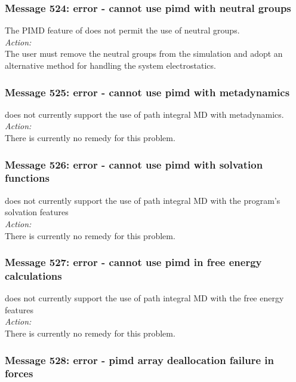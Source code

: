 \subsubsection*{Message 524: error - cannot use pimd with neutral groups}

The PIMD feature of \DD{} does not permit the use of neutral groups. \\

\noindent
{\em Action:}\\ The user must remove the neutral groups from the
simulation and adopt an alternative method for handling the system
electrostatics.

\subsubsection*{Message 525: error - cannot use pimd with metadynamics}

\DD{} does not currently support the use of path integral MD with metadynamics. \\

\noindent
{\em Action:}\\
There is currently no remedy for this problem.

\subsubsection*{Message 526: error - cannot use pimd with solvation functions}

\DD{} does not currently support the use of path integral MD with the program's solvation features\\

\noindent
{\em Action:}\\
There is currently no remedy for this problem.

\subsubsection*{Message 527: error - cannot use pimd in free energy calculations}

\DD{} does not currently support the use of path integral MD with the free energy features\\

\noindent
{\em Action:}\\
There is currently no remedy for this problem.

\subsubsection*{Message 528: error - pimd array deallocation failure in forces}


